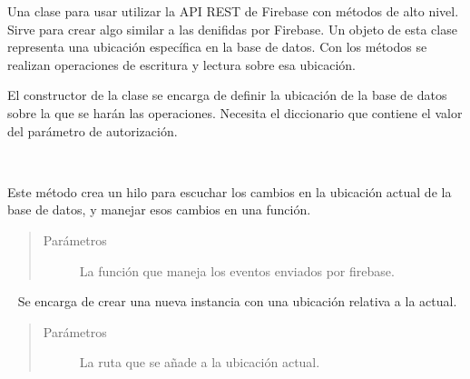 \begin{fulllineitems}
\label{\detokenize{nao_firebase:firebase.FirebaseDatabase}}
Una clase para usar utilizar la API REST de Firebase con métodos de alto nivel.
Sirve para crear algo similar a las  denifidas por Firebase.
Un objeto de esta clase representa una ubicación específica en la base de datos.
Con los métodos se realizan operaciones de escritura y lectura sobre esa ubicación.

El constructor de la clase se encarga de definir la ubicación de la base de datos
sobre la que se harán las operaciones.
Necesita el diccionario  que contiene el valor del parámetro de autorización.

\begin{fulllineitems}
\label{\detokenize{nao_firebase:firebase.FirebaseDatabase.add_event_listener}}~

\begin{fulllineitems}
\end{fulllineitems}


Este método crea un hilo para escuchar los cambios en la ubicación actual
de la base de datos, y manejar esos cambios en una función.
\begin{quote}\begin{description}
\item[{Parámetros}] \leavevmode
{} \textendash{} La función que maneja los eventos enviados por firebase.

\end{description}\end{quote}

\end{fulllineitems}


\begin{fulllineitems}
\label{\detokenize{nao_firebase:firebase.FirebaseDatabase.child}}~
Se encarga de crear una nueva instancia con una ubicación relativa a la actual.
\begin{quote}\begin{description}
\item[{Parámetros}] \leavevmode
{} \textendash{} La ruta que se añade a la ubicación actual.


\end{description}
\end{quote}
\end{fulllineitems}
\end{fulllineitems}
